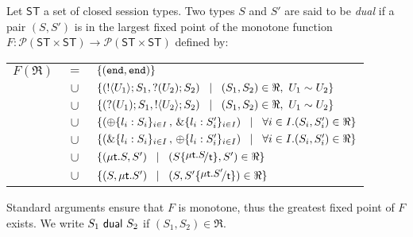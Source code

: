 \begin{definition}[Duality]
\label{def:dual}
Let $\mathsf{ST}$ a set of closed session types. 
Two types $S$ and $S'$ are said to be {\em dual} if a pair $(S,S')$ is 
in the largest fixed point of the monotone function
$F:\mathcal{P}(\mathsf{ST}\times \mathsf{ST}) \to 
\mathcal{P}(\mathsf{ST}\times \mathsf{ST})$ defined by:\\ %
\begin{tabular}{rcl}
$F(\Re)$ &$\!\!=\!\!$&	$\{(\mathtt{end}, \mathtt{end})\}$\\
         &$\!\!\cup\!\!$&	$\{(! \langle U_1 \rangle ; S_1, ? (U_2) ; S_2)
\;\;\;|\;\;\;(S_1, S_2)\in \Re, \  U_1 \sim U_2 \}$\\ 
       &$\!\!\cup\!\!$&	$\{(? (U_1) ; S_1, ! \langle U_2 \rangle ; S_2)
\;\;\;|\;\;\;(S_1, S_2)\in \Re, \ U_1 \sim U_2\}$\\ 
	&$\!\!\cup\!\!$&	$\{(\oplus \{l_i: S_i\}_{i \in I} \,,\, \& \{l_i: S_i'\}_{i \in I}) \;\;\;|\;\;\; \forall i\in I. (S_i, S_i')\in \Re\}$\\
	&$\!\!\cup\!\!$&	$\{(\& \{l_i: S_i\}_{i \in I}\,,\, \oplus \{l_i: S_i'\}_{i \in I}) \;\;\;|\;\;\; \forall i\in I. (S_i, S_i')\in \Re\}$\\
	&$\!\!\cup\!\!$&	$\set{(\trec{t}{S}, S')
\bnfbar (S\subst{\trec{t}{S}}{\vart{t}},S')\in \Re}$\\
	&$\!\!\cup\!\!$&	$\set{(S,\trec{t}{S'})
\bnfbar (S,S'\subst{\trec{t}{S'}}{\vart{t}})\in \Re}$\\[1mm]
\end{tabular}

\noindent
Standard arguments ensure that $F$ is monotone, thus the greatest fixed point
of $F$ exists. We write $S_1 \ \mathsf{dual}\  S_2$ if  $(S_1,S_2)\in \Re$. 
\end{definition}


